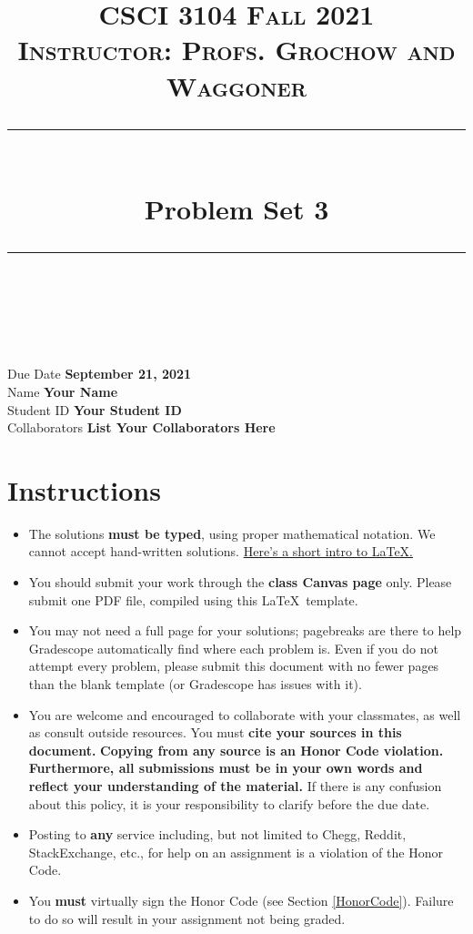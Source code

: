 \documentclass[11pt]{article}
\title{
\normalfont \normalsize 
\textsc{CSCI 3104 Fall 2021 \\ 
Instructor: Profs. Grochow and Waggoner} \\
[10pt] 
\rule{\linewidth}{0.5pt} \\[6pt] 
\huge Problem Set 3 \\
\rule{\linewidth}{2pt}  \\[10pt]
}
\date{}
\theoremstyle{definition}
\theoremstyle{definition}
\theoremstyle{definition}
\begin{document}

\maketitle


\noindent
Due Date \dotfill \textbf{September 21, 2021} \\
Name \dotfill \textbf{Your Name} \\
Student ID \dotfill \textbf{Your Student ID} \\
Collaborators \dotfill \textbf{List Your Collaborators Here}

\tableofcontents

\section{Instructions}
 \begin{itemize}
	\item The solutions \textbf{must be typed}, using proper mathematical notation. We cannot accept hand-written solutions. \href{http://ece.uprm.edu/~caceros/latex/introduction.pdf}{Here's a short intro to \LaTeX.}
	\item You should submit your work through the \textbf{class Canvas page} only. Please submit one PDF file, compiled using this \LaTeX \ template.
	\item You may not need a full page for your solutions; pagebreaks are there to help Gradescope automatically find where each problem is. Even if you do not attempt every problem, please submit this document with no fewer pages than the blank template (or Gradescope has issues with it).

	\item You are welcome and encouraged to collaborate with your classmates, as well as consult outside resources. You must \textbf{cite your sources in this document.} \textbf{Copying from any source is an Honor Code violation. Furthermore, all submissions must be in your own words and reflect your understanding of the material.} If there is any confusion about this policy, it is your responsibility to clarify before the due date. 

	\item Posting to \textbf{any} service including, but not limited to Chegg, Reddit, StackExchange, etc., for help on an assignment is a violation of the Honor Code.

	\item You \textbf{must} virtually sign the Honor Code (see Section \ref{HonorCode}). Failure to do so will result in your assignment not being graded.
\end{itemize}
\end{document}
